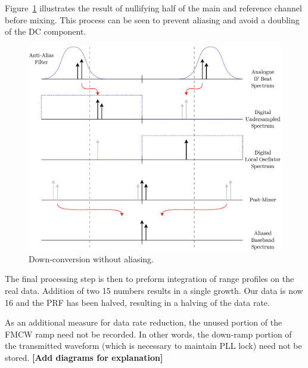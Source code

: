\documentclass[a4paper,11pt]{report}
\begin{document}
\newpage
Figure~\ref{fig:anti_alias_down_conversion} illustrates the result of nullifying half of the main and reference channel before mixing. This process can be seen to prevent aliasing and avoid a doubling of the DC component.
\begin{figure}[!ht]
    \begin{center}
        \includegraphics[width=\textwidth]{images/anti_alias_down_conversion}
        \caption{Down-conversion without aliasing.}
        \label{fig:anti_alias_down_conversion}
    \end{center}
\end{figure}

The final processing step is then to preform integration of range profiles on the real data. Addition of two \SI{15}{\bit} numbers results in a single \SI{}{\bit} growth. Our data is now \SI{16}{\bit} and the PRF has been halved, resulting in a halving of the data rate.

As an additional measure for data rate reduction, the unused portion of the FMCW ramp need not be recorded. In other words, the down-ramp portion of the transmitted waveform (which is necessary to maintain PLL lock) need not be stored. \textbf{[Add diagrams for explanation]}

\newpage
\end{document}
